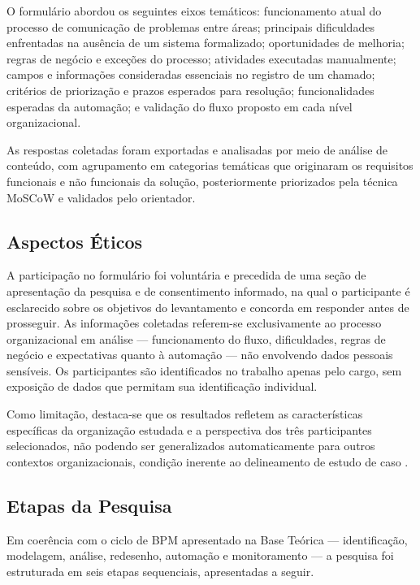 O formulário abordou os seguintes eixos temáticos:
funcionamento atual do processo de comunicação de problemas
entre áreas; principais dificuldades enfrentadas na ausência
de um sistema formalizado; oportunidades de melhoria; regras
de negócio e exceções do processo; atividades executadas
manualmente; campos e informações consideradas essenciais no
registro de um chamado; critérios de priorização e prazos
esperados para resolução; funcionalidades esperadas da
automação; e validação do fluxo proposto em cada nível
organizacional.

As respostas coletadas foram exportadas e analisadas por meio
de análise de conteúdo, com agrupamento em categorias
temáticas que originaram os requisitos funcionais e não
funcionais da solução, posteriormente priorizados pela
técnica MoSCoW e validados pelo orientador.

\subsection{Aspectos Éticos}

A participação no formulário foi voluntária e precedida de
uma seção de apresentação da pesquisa e de consentimento
informado, na qual o participante é esclarecido sobre os
objetivos do levantamento e concorda em responder antes de
prosseguir. As informações coletadas referem-se exclusivamente
ao processo organizacional em análise --- funcionamento do
fluxo, dificuldades, regras de negócio e expectativas quanto à
automação --- não envolvendo dados pessoais sensíveis. Os
participantes são identificados no trabalho apenas pelo
cargo, sem exposição de dados que permitam sua identificação
individual.

Como limitação, destaca-se que os resultados refletem as
características específicas da organização estudada e a
perspectiva dos três participantes selecionados, não podendo
ser generalizados automaticamente para outros contextos
organizacionais, condição inerente ao delineamento de estudo
de caso \cite{Gil2002}.

\subsection{Etapas da Pesquisa}

Em coerência com o ciclo de BPM apresentado na Base Teórica
--- identificação, modelagem, análise, redesenho, automação e
monitoramento --- a pesquisa foi estruturada em seis etapas
sequenciais, apresentadas a seguir.

